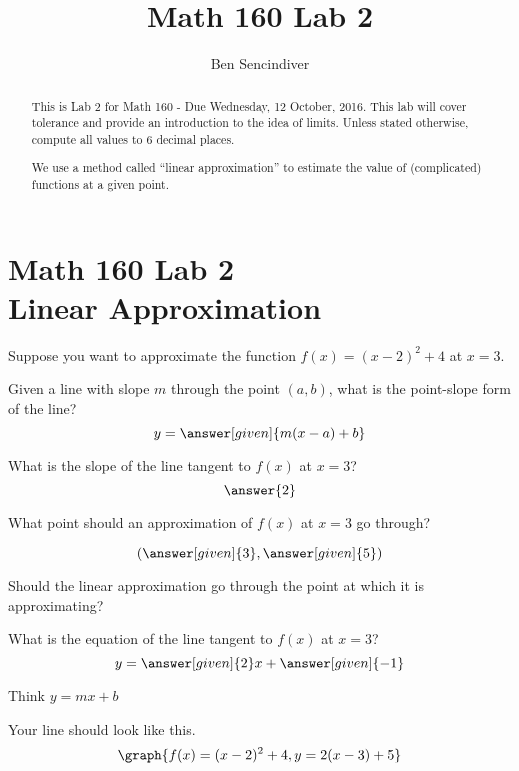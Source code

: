 \documentclass[handout,nooutcomes]{ximera}
\title{Math 160 Lab 2}
\author{Ben Sencindiver} %
\begin{document}
\section{Math 160 Lab 2 \\ Linear Approximation}

\begin{abstract}
This is Lab 2 for Math 160 - Due Wednesday, 12 October, 2016. This lab will cover tolerance and provide an introduction to the idea of limits. Unless stated otherwise, compute all values to $6$ decimal places.

We use a method called ``linear approximation'' to estimate the value of (complicated) functions at a given point.
\end{abstract}

\maketitle

\bigskip

Suppose you want to approximate the function $f(x) = (x-2)^2  + 4$ at $x=3$.

Given a line with slope $m$ through the point $(a, b)$, what is the point-slope form of the line?
\[
y = \answer[given]{m(x - a) + b}
\]

What is the slope of the line tangent to $f(x)$ at $x=3$?
\[
\answer{2}
\]

\begin{problem}
What point should an approximation of $f(x)$ at $x=3$ go through?

\[
(\answer[given]{3}, \answer[given]{5})
\]
\begin{hint}
Should the linear approximation go through the point at which it is approximating?
\end{hint}
\end{problem}

\begin{problem}
What is the equation of the line tangent to $f(x)$ at $x=3$?
\[
y = \answer[given]{2}x + \answer[given]{-1}
\]
\begin{hint}
Think $y=mx+b$
\end{hint}

\begin{feedback}
Your line should look like this.
\[
\graph{f(x) = (x-2)^2+4, y = 2(x-3) + 5}
\]
\end{feedback}
\end{problem}
\end{document}
